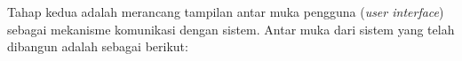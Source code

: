 Tahap kedua adalah merancang tampilan antar muka pengguna (\textit{user interface}) sebagai mekanisme komunikasi dengan sistem. Antar muka dari sistem yang telah dibangun adalah sebagai berikut:
\begin{enumerate}[a.]




\end{enumerate}
